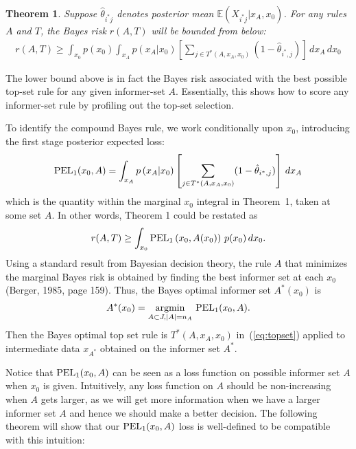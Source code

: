 \documentclass[12pt]{article}
\newtheorem{theorem}{Theorem}
\DeclareMathOperator*{\argmin}{argmin}
\begin{document}
\begin{theorem}
Suppose $\hat \theta_{i^*j}$ denotes posterior mean  $\mathbb{E}(X_{i^*j}|x_A,x_0)$.
For any rules $A$ and $T$, the Bayes risk $r(A,T)$ will be bounded from below:
\begin{eqnarray*}
r( A, T ) \geq \int_{x_0} p(x_0) \int_{x_A} p( x_A | x_0 )
\left[ \sum_{j \in  T^*(A,x_A,x_0)} ( 1 - \hat \theta_{i^*,j}) \right] \, dx_A  \,  dx_0
\end{eqnarray*}

\end{theorem}
The lower bound above is in fact the Bayes risk associated with the best possible top-set rule for any
given informer-set $A$.  Essentially, this shows how to score any informer-set rule by
profiling out the top-set selection.   


To identify the compound Bayes rule, we work conditionally upon $x_0$, introducing the first stage 
posterior expected loss:
\begin{eqnarray}
\label{eq:pel}
{\mbox {\rm PEL}}_1(x_0,A) = \int_{x_{ A}} p\left( x_{A} | x_0 \right)
\left[ \sum_{j \in  T^*(A,x_A,x_0)} ( 1 - \hat \theta_{i^*,j} ) \right] \, dx_{ A} 
\end{eqnarray}
which is the quantity within the marginal $x_0$ integral in Theorem~1, taken at some set $A$. In other words, 
Theorem 1 could be restated as 
\begin{eqnarray*}
r(A, T ) \geq \int_{x_0} {\mbox {\rm PEL}}_1 \left(x_0, A(x_0) \right) \, p(x_0) \, d x_0.
\end{eqnarray*}
Using a standard result from Bayesian decision theory, the rule $A$ 
that minimizes the marginal Bayes risk is obtained by
finding the best informer set at each $x_0$ (Berger, 1985, page 159).  Thus,
the Bayes optimal informer set  $A^*(x_0)$  is
\begin{eqnarray}
\label{eq:boise}
A^*(x_0) = \argmin\limits_{A \subset J,|A| = n_A}  \, {\mbox {\rm PEL}}_1(x_0,A).
\end{eqnarray}
Then the Bayes optimal top set rule is $T^*(A,x_A,x_0)$ in~(\ref{eq:topset})
applied to intermediate data $x_{A^*}$ obtained on the informer set $A^*$.

Notice that ${\mbox {\rm PEL}}_1(x_0, A)$ can be seen as a loss function on possible informer set $A$ when $x_0$ is given. Intuitively, any loss function on $A$ should be non-increasing when $A$ gets larger, as we will get more information when we have a larger informer set $A$ and hence we should make a better decision. 
The following theorem will show that our ${\mbox {\rm PEL}}_1(x_0,A)$ loss is well-defined to be compatible with this intuition:
\end{document}
